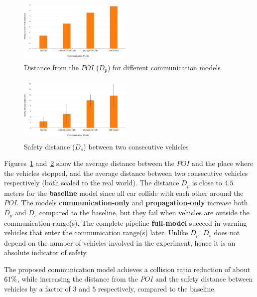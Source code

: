 \begin{figure}[t]
    \centering
    \includegraphics[width=0.48\textwidth, height=120px]{figures/distance_from_POI.pdf}
    \caption{Distance from the $POI$ ($D_p$) for different communication models \label{fig:distance_from_poi}}
\end{figure}

\begin{figure}[t]
    \centering
    \includegraphics[width=0.48\textwidth, height=120px]{figures/safety_distance.pdf}
    \caption{Safety distance ($D_s$) between two consecutive vehicles \label{fig:safety_distance}}
\end{figure}

Figures~\ref{fig:distance_from_poi} and~\ref{fig:safety_distance} show the average distance 
between the $POI$ and the place where the vehicles stopped, and the average distance 
between two consecutive vehicles respectively (both scaled to the real world).
The distance $D_p$ is close to $4.5$ meters for the \textbf{baseline} model since all car collide with each 
other around the $POI$. The models \textbf{communication-only} and \textbf{propagation-only} increase both 
$D_p$ and $D_s$ compared to the baseline, but they fail when vehicles are outside the communication range(s).
The complete pipeline \textbf{full-model} succeed in warning vehicles that enter the communication range(s) later.
Unlike $D_p$, $D_s$ does not depend on the number of vehicles involved in the experiment, hence it 
is an absolute indicator of safety.

The proposed communication model achieves a collision ratio reduction of about $\collision_ratio_reduction_perc\%$,
while increasing the distance from the $POI$ and the safety distance between vehicles by a factor of 
$3$ and $5$ respectively, compared to the baseline.
